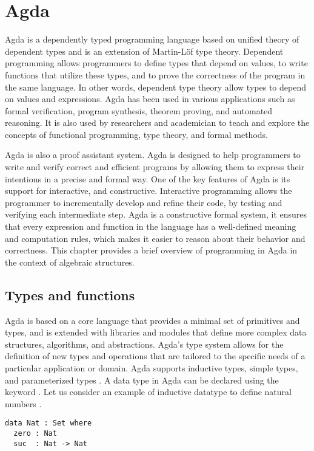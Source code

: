 \chapter{Agda}
Agda is a dependently typed programming language based on unified theory of
dependent types and is an extension of Martin-Löf type theory. Dependent
programming allows programmers to define types that depend on values, to write
functions that utilize these types, and to prove the correctness of the program
in the same language. In other words, dependent type theory allow types to
depend on values and expressions. Agda has been used in various applications
such as formal verification, program synthesis, theorem proving, and automated
reasoning. It is also used by researchers and academician to teach and explore
the concepts of functional programming, type theory, and formal methods.

Agda is also a proof assistant system. Agda is designed to help programmers to
write and verify correct and efficient programs by allowing them to express
their intentions in a precise and formal way. One of the key features of Agda is
its support for interactive, and constructive. Interactive programming allows
the programmer to incrementally develop and refine their code, by testing and
verifying each intermediate step. Agda is a constructive formal system, it
ensures that every expression and function in the language has a well-defined
meaning and computation rules, which makes it easier to reason about their
behavior and correctness. This chapter provides a brief overview of programming
in Agda in the context of algebraic structures. 

\section{Types and functions}
Agda is based on a core language that provides a minimal set of primitives and
types, and is extended with libraries and modules that define more complex data
structures, algorithms, and abstractions. Agda's type system allows for the
definition of new types and operations that are tailored to the specific needs
of a particular application or domain. Agda supports inductive types, simple
types, and parameterized types \cite{10.1007/978-3-642-03359-9_6}. A data type
in Agda can be declared using the keyword . Let us consider an
example of inductive datatype to define natural numbers .
\label{code:Nat}
\begin{verbatim}
data Nat : Set where
  zero : Nat
  suc  : Nat -> Nat
\end{verbatim}


